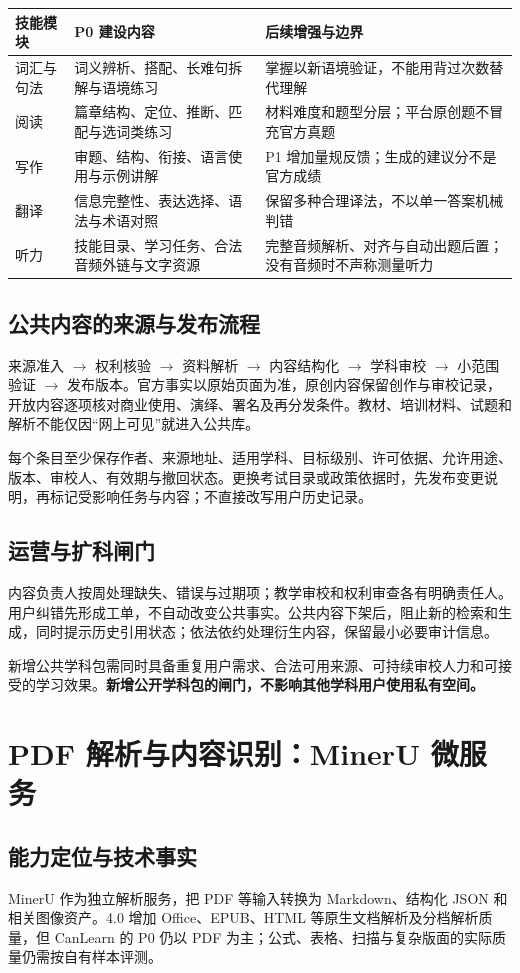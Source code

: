 \documentclass[UTF8,a4paper,11pt,fontset=none]{ctexart}
\newcommand{\cth}[1]{\textbf{\sffamily #1}}
\newcommand{\newsec}[1]{\clearpage\section{#1}}
\newenvironment{tbl}{\par\vspace{3pt}\small\noindent\ignorespaces}{\unskip\par\vspace{5pt}}
\begin{document}
\begin{tbl}
\begin{tabularx}{\linewidth}{@{}L{25mm}YY@{}}
\toprule
\cth{技能模块}&\cth{P0 建设内容}&\cth{后续增强与边界}\\\midrule
词汇与句法&词义辨析、搭配、长难句拆解与语境练习&掌握以新语境验证，不能用背过次数替代理解\\
阅读&篇章结构、定位、推断、匹配与选词类练习&材料难度和题型分层；平台原创题不冒充官方真题\\
写作&审题、结构、衔接、语言使用与示例讲解&P1 增加量规反馈；生成的建议分不是官方成绩\\
翻译&信息完整性、表达选择、语法与术语对照&保留多种合理译法，不以单一答案机械判错\\
听力&技能目录、学习任务、合法音频外链与文字资源&完整音频解析、对齐与自动出题后置；没有音频时不声称测量听力\\
\bottomrule
\end{tabularx}
\end{tbl}

\subsection{公共内容的来源与发布流程}
来源准入 $\rightarrow$ 权利核验 $\rightarrow$ 资料解析 $\rightarrow$ 内容结构化 $\rightarrow$ 学科审校 $\rightarrow$ 小范围验证 $\rightarrow$ 发布版本。官方事实以原始页面为准，原创内容保留创作与审校记录，开放内容逐项核对商业使用、演绎、署名及再分发条件。教材、培训材料、试题和解析不能仅因“网上可见”就进入公共库。\cite{copyright}

每个条目至少保存作者、来源地址、适用学科、目标级别、许可依据、允许用途、版本、审校人、有效期与撤回状态。更换考试目录或政策依据时，先发布变更说明，再标记受影响任务与内容；不直接改写用户历史记录。

\subsection{运营与扩科闸门}
内容负责人按周处理缺失、错误与过期项；教学审校和权利审查各有明确责任人。用户纠错先形成工单，不自动改变公共事实。公共内容下架后，阻止新的检索和生成，同时提示历史引用状态；依法依约处理衍生内容，保留最小必要审计信息。

新增公共学科包需同时具备重复用户需求、合法可用来源、可持续审校人力和可接受的学习效果。\textbf{新增公开学科包的闸门，不影响其他学科用户使用私有空间。}

\newsec{PDF 解析与内容识别：MinerU 微服务}
\subsection{能力定位与技术事实}
MinerU 作为独立解析服务，把 PDF 等输入转换为 Markdown、结构化 JSON 和相关图像资产。4.0 增加 Office、EPUB、HTML 等原生文档解析及分档解析质量，但 CanLearn 的 P0 仍以 PDF 为主；公式、表格、扫描与复杂版面的实际质量仍需按自有样本评测。\cite{mineru_release,mineru_output}
\end{document}
